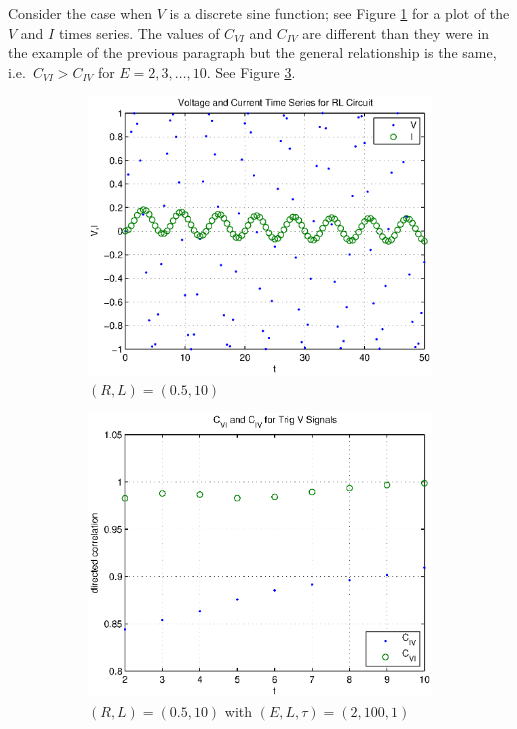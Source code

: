 \documentclass[a4paper,11pt]{article}
\begin{document}
Consider the case when $V$ is a discrete sine function; see Figure \ref{fig:RL_sinsignals} for a plot of the $V$ and $I$ times series.  The values of $C_{VI}$ and $C_{IV}$ are different than they were in the example of the previous paragraph but the general relationship is the same, i.e.\ $C_{VI}>C_{IV}$ for $E=2,3,\ldots,10$.  See Figure \ref{fig:RL_sinsignalsCCM}.
\begin{figure}[h!t]
\centering
\begin{subfigure}[b]{0.4\textwidth}
\label{fig:RL_sinsignals}
\includegraphics[scale=0.55]{RL_sinsignals.eps}
\caption{$(R,L) = (0.5,10)$}
\end{subfigure}
\begin{subfigure}[b]{0.4\textwidth}
\label{fig:RL_sinsignalsCCM}
\includegraphics[scale=0.55]{RL_sinsignalsCCM.eps}
\caption{$(R,L) = (0.5,10)$ with $\left(E,L,\tau\right)=\left(2,100,1\right)$}
\end{subfigure}
\caption{}
\end{figure}
\end{document}
